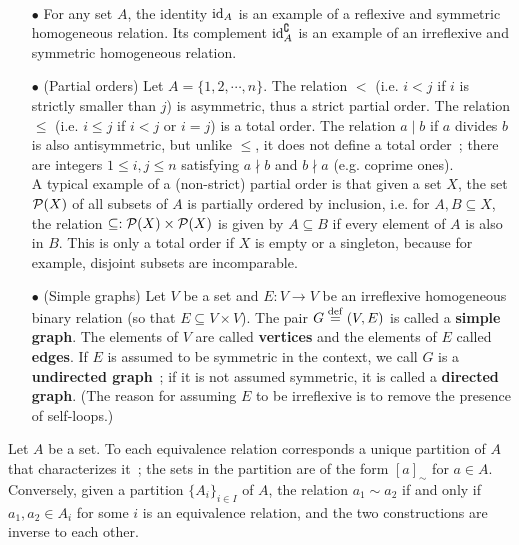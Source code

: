 \begin{example} 
    \quad \\
    \begin{itemize}
        \item[$\bullet$] For any set $A$, the identity $\operatorname{\mathrm{id}}_{A}$ is an example of a reflexive and symmetric homogeneous relation. Its complement $\operatorname{\mathrm{id}}_{A}^{\complement}$ is an example of an irreflexive and symmetric homogeneous relation.
        \\

        \item[$\bullet$] (Partial orders) Let $A = \{1,2,\cdots,n\}$. The relation $<$ (i.e. $i < j$ if $i$ is strictly smaller than $j$) is asymmetric, thus a strict partial order. The relation $\le$ (i.e. $i \le j$ if $i < j$ or $i = j$) is a total order. The relation $a \mid b$ if $a$ divides $b$ is also antisymmetric, but unlike $\le$, it does not define a total order~; there are integers $1 \le i,j \le n$ satisfying $a \nmid b$ and $b \nmid a$ (e.g. coprime ones).
        \\

        A typical example of a (non-strict) partial order is that given a set $X$, the set $\operatorname{\mathcal P}(X)$ of all subsets of $A$ is partially ordered by inclusion, i.e. for $A,B \subseteq X$, the relation $\subseteq : \operatorname{\mathcal P}(X) \times \operatorname{\mathcal P}(X)$ is given by $A \subseteq B$ if every element of $A$ is also in $B$. This is only a total order if $X$ is empty or a singleton, because for example, disjoint subsets are incomparable. 
        \\

        \item[$\bullet$] (Simple graphs) Let $V$ be a set and $E : V \to V$ be an irreflexive homogeneous binary relation (so that $E \subseteq V \times V$). The pair $G \overset{\mathrm{def}}{=} (V,E)$ is called a \textbf{simple graph}. The elements of $V$ are called \textbf{vertices} and the elements of $E$ called \textbf{edges}. If $E$ is assumed to be symmetric in the context, we call $G$ is a \textbf{undirected graph}~; if it is not assumed symmetric, it is called a \textbf{directed graph}. (The reason for assuming $E$ to be irreflexive is to remove the presence of self-loops.) 
        \\
    \end{itemize}
\end{example}

\begin{theorem} \label{equivalence-relations-and-partitions}
    Let $A$ be a set. To each equivalence relation corresponds a unique partition of $A$ that characterizes it~; the sets in the partition are of the form $[a]_{\sim}$ for $a \in A$. Conversely, given a partition $\{A_i\}_{i \in I}$ of $A$, the relation $a_1 \sim a_2$ if and only if $a_1,a_2 \in A_i$ for some $i$ is an equivalence relation, and the two constructions are inverse to each other.
\end{theorem}

